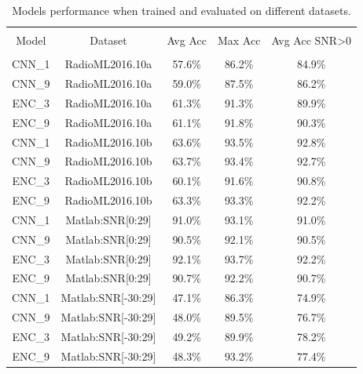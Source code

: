 \begin{table}[h!]
\centering
\begin{tabular}{| c  c  c  c  c |} 
 \hline \\[-1em]
 Model & Dataset & Avg Acc & Max Acc & Avg Acc SNR>0 \\ [1ex]  \\[-1em]  
 \hline
    CNN\_1 & RadioML2016.10a & 57.6\% & 86.2\% & 84.9\%\\ [1ex]
    CNN\_9 & RadioML2016.10a & 59.0\% & 87.5\% & 86.2\%\\ [1ex]

    \hline
    ENC\_3 & RadioML2016.10a & 61.3\% & 91.3\% & 89.9\%\\ [1ex]
    ENC\_9 & RadioML2016.10a & 61.1\% & 91.8\% & 90.3\%\\ [1ex]

    \hline
    CNN\_1 & RadioML2016.10b & 63.6\% & 93.5\% & 92.8\%\\ [1ex]
    CNN\_9 & RadioML2016.10b & 63.7\% & 93.4\% & 92.7\%\\ [1ex]

    \hline
    ENC\_3 & RadioML2016.10b & 60.1\% & 91.6\% & 90.8\%\\ [1ex]
    ENC\_9 & RadioML2016.10b & 63.3\% & 93.3\% & 92.2\%\\ [1ex]

    \hline
    CNN\_1 & Matlab:SNR[0:29] & 91.0\% & 93.1\% & 91.0\%\\ [1ex]
    CNN\_9 & Matlab:SNR[0:29] & 90.5\% & 92.1\% & 90.5\%\\ [1ex]

    \hline
    ENC\_3 & Matlab:SNR[0:29] & 92.1\% & 93.7\% & 92.2\%\\ [1ex]
    ENC\_9 & Matlab:SNR[0:29] & 90.7\% & 92.2\% & 90.7\%\\ [1ex]

    \hline
    CNN\_1 & Matlab:SNR[-30:29] & 47.1\% & 86.3\% & 74.9\%\\ [1ex]
    CNN\_9 & Matlab:SNR[-30:29] & 48.0\% & 89.5\% & 76.7\%\\ [1ex]

    \hline
    ENC\_3 & Matlab:SNR[-30:29] & 49.2\% & 89.9\% & 78.2\%\\ [1ex]
    ENC\_9 & Matlab:SNR[-30:29] & 48.3\% & 93.2\% & 77.4\%\\ [1ex]

\hline
\end{tabular}
\caption{Models performance when trained and evaluated on different datasets.}
\label{table:best_models_different_datasets}
\end{table}

